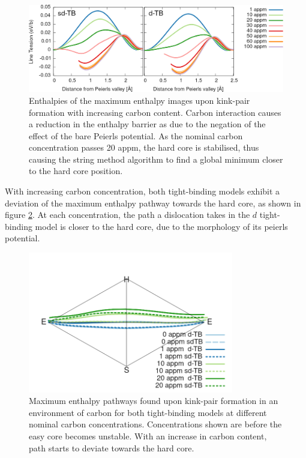 \documentclass[a4paper,11pt]{article}
\numberwithin{equation}{chapter}
\numberwithin{listing}{chapter}
\begin{document}
\begin{figure}[htbp]
\centering
\includegraphics[width=1.\textwidth]{iron/Images/kink-pair_equilibrium_combined_moving_sites.png}
\caption{Enthalpies of the maximum enthalpy images upon kink-pair formation with increasing carbon content. Carbon interaction causes a reduction in the enthalpy barrier as due to the negation of the effect of the bare Peierls potential. As the nominal carbon concentration passes 20 appm, the hard core is stabilised, thus causing the string method algorithm to find a global minimum closer to the hard core position. \label{fig:kinkpairequib}}
\end{figure}


With increasing carbon concentration, both tight-binding models exhibit a
deviation of the maximum enthalpy pathway towards the hard core, as shown in figure
\ref{fig:kpequibpath}. At each concentration, the path a dislocation takes in the \(d\)
tight-binding model is closer to the hard core, due to the morphology of its
peierls potential.


\begin{figure}[htbp]
\centering
\includegraphics[width=0.8\textwidth]{iron/Images/pathway_equilibrium_sdTB_dTB_20appm_all.png}
\caption{Maximum enthalpy pathways found upon kink-pair formation in an environment of carbon for both tight-binding models at different nominal carbon concentrations. Concentrations shown are before the easy core becomes unstable. With an increase in carbon content, path starts to deviate towards the hard core. \label{fig:kpequibpath}}
\end{figure}
\end{document}
